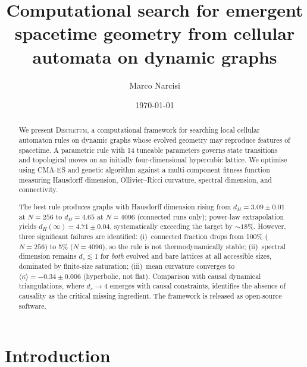 \documentclass[aps,prd,twocolumn,superscriptaddress,floatfix]{revtex4-2}
\begin{document}
\title{Computational search for emergent spacetime geometry from
cellular automata on dynamic graphs}

\author{Marco Narcisi}

\date{\today}

\begin{abstract}
We present \textsc{Discretum}, a computational framework for searching
local cellular automaton rules on dynamic graphs whose evolved geometry
may reproduce features of spacetime.
A parametric rule with 14 tuneable parameters governs state transitions
and topological moves on an initially four-dimensional hypercubic lattice.
We optimise using CMA-ES and genetic algorithm against a multi-component
fitness function measuring Hausdorff dimension, Ollivier--Ricci curvature,
spectral dimension, and connectivity.

The best rule produces graphs with Hausdorff dimension rising from
$d_H = 3.09 \pm 0.01$ at $N\!=\!256$ to $d_H = 4.65$ at $N\!=\!4096$
(connected runs only); power-law extrapolation yields
$d_H(\infty) = 4.71 \pm 0.04$, systematically exceeding the target by
${\sim}18\%$.
However, three significant failures are identified:
(i)~connected fraction drops from 100\% ($N\!=\!256$) to 5\%
($N\!=\!4096$), so the rule is not thermodynamically stable;
(ii)~spectral dimension remains $d_s \lesssim 1$ for \emph{both}
evolved and bare lattices at all accessible sizes, dominated by
finite-size saturation;
(iii)~mean curvature converges to
$\langle\kappa\rangle = -0.34 \pm 0.006$ (hyperbolic, not flat).
Comparison with causal dynamical triangulations, where $d_s \to 4$
emerges with causal constraints, identifies the absence of causality
as the critical missing ingredient.
The framework is released as open-source software.
\end{abstract}

\maketitle

\section{Introduction}
\label{sec:intro}
\end{document}
